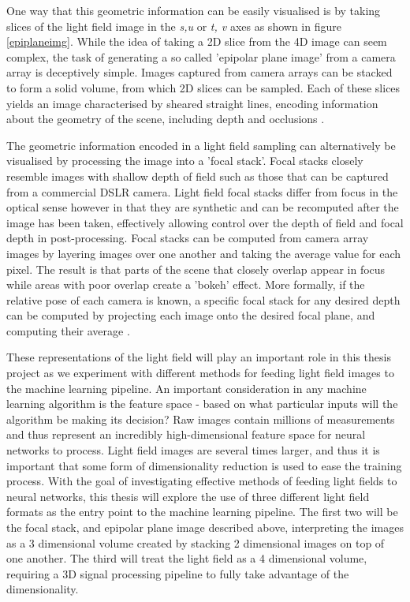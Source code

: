 \documentclass[openany]{book}
\begin{document}
One way that this geometric information can be easily visualised is by taking slices of the light field image in the \textit{s,u} or \textit{t, v} axes as shown in figure \ref{epiplaneimg}. While the idea of taking a 2D slice from the 4D image can seem complex, the task of generating a so called 'epipolar plane image' from a camera array is deceptively simple. Images captured from camera arrays can be stacked to form a solid volume, from which 2D slices can be sampled. Each of these slices yields an image characterised by sheared straight lines, encoding information about the geometry of the scene, including depth and occlusions \cite{bolles1987epiplane}. 

The geometric information encoded in a light field sampling can alternatively be visualised by processing the image into a 'focal stack'. Focal stacks closely resemble images with shallow depth of field such as those that can be captured from a commercial DSLR camera. Light field focal stacks differ from focus in the optical sense however in that they are synthetic and can be recomputed after the image has been taken, effectively allowing control over the depth of field and focal depth in post-processing. Focal stacks can be computed from camera array images by layering images over one another and taking the average value for each pixel. The result is that parts of the scene that closely overlap appear in focus while areas with poor overlap create a 'bokeh' effect. More formally, if the relative pose of each camera is known, a specific focal stack for any desired depth can be computed by projecting each image onto the desired focal plane, and computing their average \cite{vaish2004parallax}.

These representations of the light field will play an important role in this thesis project as we experiment with different methods for feeding light field images to the machine learning pipeline. An important consideration in any machine learning algorithm is the feature space - based on what particular inputs will the algorithm be making its decision? Raw images contain millions of measurements and thus represent an incredibly high-dimensional feature space for neural networks to process. Light field images are several times larger, and thus it is important that some form of dimensionality reduction is used to ease the training process. With the goal of investigating effective methods of feeding light fields to neural networks, this thesis will explore the use of three different light field formats as the entry point to the machine learning pipeline. The first two will be the focal stack, and epipolar plane image described above, interpreting the images as a 3 dimensional volume created by stacking 2 dimensional images on top of one another. The third will treat the light field as a 4 dimensional volume, requiring a 3D signal processing pipeline to fully take advantage of the dimensionality.
\end{document}
